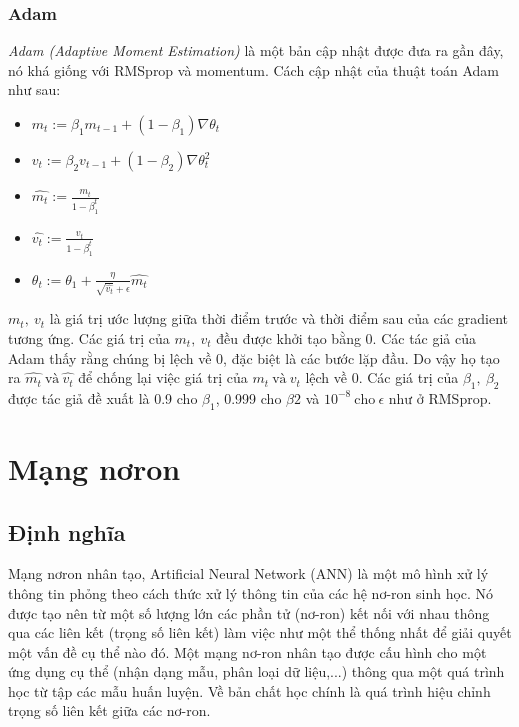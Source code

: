 \subsubsection{Adam}
\hspace{5mm} \textit{Adam (Adaptive Moment Estimation)} là một bản cập nhật được đưa ra gần đây, nó khá giống với RMSprop và momentum. Cách cập nhật của thuật toán Adam như sau:
\begin{itemize}
\item[]  $m_t := \beta_1 m_{t-1} + (1-\beta_1) \nabla\theta_{t}$
\item[] $v_t := \beta_2 v_{t-1} + (1-\beta_2) \nabla\theta^2_{t}$
\item[] $ \widehat{m_t} := \frac{m_t}{1-\beta_1^{t}}$
\item[] $ \widehat{v_t} := \frac{v_t}{1-\beta_1^{t}} $
\item[] $\theta_t := \theta_1 + \frac{\eta }{\sqrt{\widehat{v_t}} +\epsilon}\widehat{m_t}$ 
\end{itemize}
$m_t,~v_t$ là giá trị ước lượng giữa thời điểm trước và thời điểm sau của các gradient tương ứng. Các giá trị của $m_t,~v_t$ đều được khởi tạo bằng 0. Các tác giả của Adam thấy rằng chúng bị lệch về 0, đặc biệt là các bước lặp đầu. Do vậy họ tạo ra $\widehat{m_t}~\text{và}~\widehat{v_t}$ để chống lại việc giá trị của $m_t ~\text{và}~ v_t$ lệch về 0. Các giá trị của $\beta_1,~\beta_2$ được tác giả đề xuất là 0.9 cho $\beta_1$, 0.999 cho $\beta2$  và $10^{-8} ~\text{cho}~ \epsilon$ như ở RMSprop.


\section{Mạng nơron}
\subsection{Định nghĩa}
Mạng nơron nhân tạo, Artificial Neural Network (ANN) là một mô hình xử lý thông tin phỏng theo cách thức xử lý thông tin của các hệ nơ-ron sinh học. Nó được tạo nên từ một số lượng lớn các phần tử (nơ-ron) kết nối với nhau thông qua các liên kết (trọng số liên kết) làm việc như một thể thống nhất để giải quyết một vấn đề cụ thể nào đó. Một mạng nơ-ron nhân tạo được cấu hình cho một ứng dụng cụ thể (nhận dạng mẫu, phân loại dữ liệu,...) thông qua một quá trình học từ tập các mẫu huấn luyện. Về bản chất học chính là quá trình hiệu chỉnh trọng số liên kết giữa các nơ-ron.

